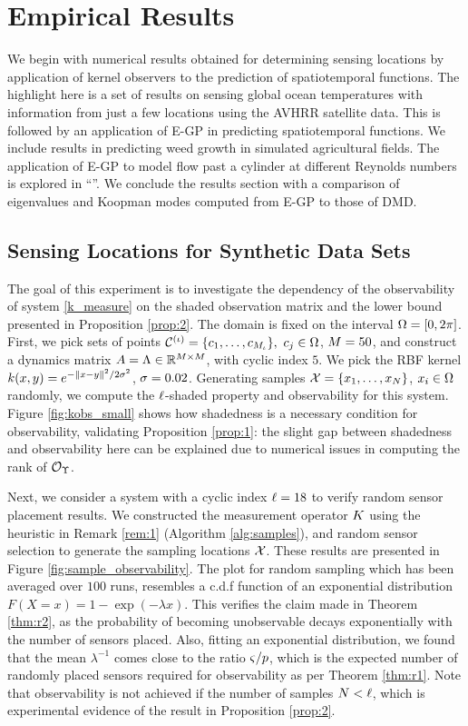 \section{Empirical Results}
We begin with numerical results obtained for determining sensing locations by application of kernel observers to the prediction of spatiotemporal functions. The highlight here is a set of results on sensing global ocean temperatures with information from just a few locations using the AVHRR satellite data. This is followed by an application of E-GP in predicting spatiotemporal functions. We include results in predicting weed growth in simulated agricultural fields. The application of E-GP to model flow past a cylinder at different Reynolds numbers is explored in ``''. We conclude the results section with a comparison of eigenvalues and Koopman modes computed from E-GP to those of DMD. 


\subsection{Sensing Locations for Synthetic Data Sets}\label{sec:exp}
The goal of this experiment is to investigate the dependency of the observability of system \eqref{k_measure} on the shaded observation matrix and the lower bound presented in Proposition \ref{prop:2}. The domain is fixed on the interval $\Omega = [0,2\pi]$. First, we pick sets of points $\mathcal{C}^{(\iota)} = \{c_1,\dots,c_{M_{\iota}}\}, \ c_{j}\in\Omega$, $M=50$, and construct a dynamics matrix $A = \Lambda \in {\mathbb{R}^{M\times M}}$, with cyclic index $5$.  We pick the RBF kernel $k(x,y) = e^{-\|x-y\|^2/2\sigma^2}$, $\sigma=0.02$. Generating samples $\mathcal{X}=\{x_1, \dots, x_{N}\}$, $x_{i}\in\Omega$ randomly, we compute the $\ell$-shaded property and observability for this system. Figure \ref{fig:kobs_small} shows how shadedness is a necessary condition for observability, validating Proposition \ref{prop:1}: the slight gap between shadedness and observability here can be explained due to numerical issues in computing the rank of $\mathcal{O}_{\Upsilon}$. 
 
Next, we  consider a system with a cyclic index $\ell=18$ to verify random sensor placement results. We constructed the measurement operator $K$ using the heuristic in Remark \ref{rem:1} (Algorithm \ref{alg:samples}), and random sensor selection to generate the sampling locations $\mathcal{X}$. These results are presented in Figure \ref{fig:sample_observability}. The plot for random sampling which has been averaged over $ 100 $ runs, resembles a c.d.f function of an exponential distribution $ F(X=x)=1-\exp(-\lambda x) $. This verifies the claim made in Theorem \ref{thm:r2}, as the probability of becoming unobservable decays exponentially with the number of sensors placed. Also, fitting an exponential distribution, we found that the mean $ \lambda^{-1}$ comes close to the ratio $ {\varsigma}/{p} $, which is the expected number of randomly placed sensors required for observability as per Theorem \ref{thm:r1}. Note that observability is not achieved if the number of samples $N < \ell$, which is experimental evidence of the result in Proposition \ref{prop:2}. 


